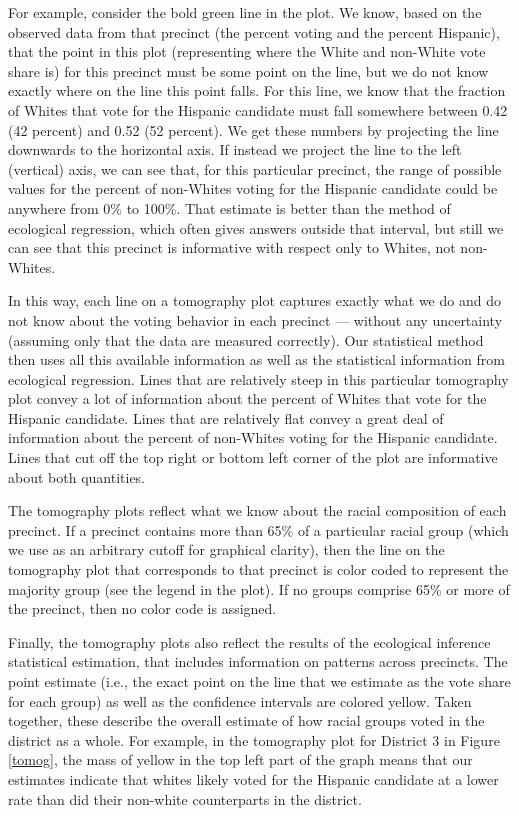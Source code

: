 \documentclass[12pt]{article}
\begin{document}
For example, consider the bold green line in the plot. We know, based
on the observed data from that precinct (the percent voting and the
percent Hispanic), that the point in this plot (representing where the
White and non-White vote share is) for this precinct must be some
point on the line, but we do not know exactly where on the line this
point falls. For this line, we know that the fraction of Whites that
vote for the Hispanic candidate must fall somewhere between 0.42 (42
percent) and 0.52 (52 percent). We get these numbers by projecting the
line downwards to the horizontal axis. If instead we project the line
to the left (vertical) axis, we can see that, for this particular
precinct, the range of possible values for the percent of non-Whites
voting for the Hispanic candidate could be anywhere from 0\% to 100\%.
That estimate is better than the method of ecological regression,
which often gives answers outside that interval, but still we can see
that this precinct is informative with respect only to Whites, not
non-Whites. 

In this way, each line on a tomography plot captures exactly what we
do and do not know about the voting behavior in each precinct ---
without any uncertainty (assuming only that the data are measured
correctly). Our statistical method then uses all this available
information as well as the statistical information from ecological
regression. Lines that are relatively steep in this particular
tomography plot convey a lot of information about the percent of
Whites that vote for the Hispanic candidate.  Lines that are
relatively flat convey a great deal of information about the percent
of non-Whites voting for the Hispanic candidate.  Lines that cut off
the top right or bottom left corner of the plot are informative about
both quantities.

The tomography plots reflect what we know about the racial composition
of each precinct. If a precinct contains more than 65\% of a
particular racial group (which we use as an arbitrary cutoff for
graphical clarity), then the line on the tomography plot that
corresponds to that precinct is color coded to represent the majority
group (see the legend in the plot). If no groups comprise 65\% or more
of the precinct, then no color code is assigned.  

Finally, the tomography plots also reflect the results of the
ecological inference statistical estimation, that includes information
on patterns across precincts. The point estimate (i.e., the exact
point on the line that we estimate as the vote share for each group)
as well as the confidence intervals are colored yellow.  Taken
together, these describe the overall estimate of how racial groups
voted in the district as a whole. For example, in the tomography plot
for District 3 in Figure \ref{tomog}, the mass of yellow in the top left
part of the graph means that our estimates indicate that whites likely voted for the Hispanic candidate at a lower rate than did their
non-white counterparts in the district.  
\end{document}
